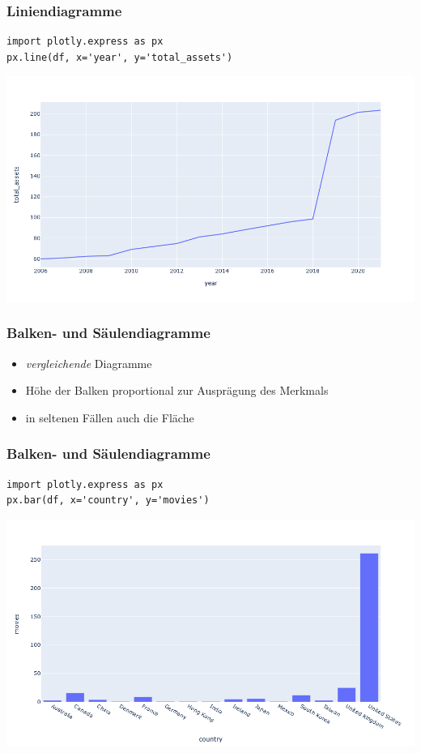 \begin{frame}[fragile]
\frametitle{Liniendiagramme}

\begin{verbatim}
import plotly.express as px
px.line(df, x='year', y='total_assets')
\end{verbatim}

\vspace{-\baselineskip}

\begin{center}
\includegraphics[width=0.85\linewidth]{fig5/line1.png}
\end{center}
\end{frame}


\begin{frame}
\frametitle{Balken- und Säulendiagramme}

\begin{itemize}
\item \textit{vergleichende} Diagramme
\item Höhe der Balken proportional zur Ausprägung des Merkmals
\item in seltenen Fällen auch die Fläche
\end{itemize}
\end{frame}


\begin{frame}[fragile]
\frametitle{Balken- und Säulendiagramme}

\begin{verbatim}
import plotly.express as px
px.bar(df, x='country', y='movies')
\end{verbatim}

\vspace{-\baselineskip}

\begin{center}
\includegraphics[width=0.85\linewidth]{fig5/bar1.png}
\end{center}
\end{frame}


